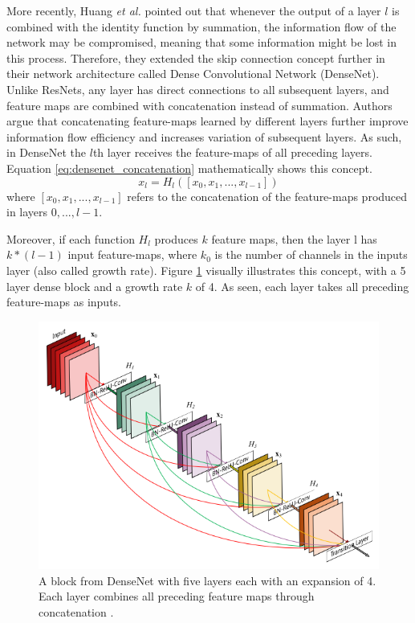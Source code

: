     More recently, Huang \textit{et al.} \cite{densenet} pointed out that whenever the output of a layer $l$ is combined with the identity function by summation, the information flow of the network may be compromised, meaning that some information might be lost in this process. Therefore, they extended the skip connection concept further in their network architecture called Dense Convolutional Network (DenseNet). Unlike ResNets, any layer has direct connections to all subsequent layers, and feature maps are combined with concatenation instead of summation. Authors argue that concatenating feature-maps learned by different layers further improve information flow efficiency and increases variation of subsequent layers. As such, in DenseNet the $l$th layer receives the feature-maps of all preceding layers. Equation \ref{eq:densenet_concatenation} mathematically shows this concept. 
    \begin{equation}
        x_l = H_l([x_0, x_1, . . . , x_{l-1}])
        \label{eq:densenet_concatenation}
    \end{equation}
    where $ [x_0, x_1, . . . , x_{l-1}] $ refers to the concatenation of the feature-maps produced in layers $ 0, . . . , l-1 $. \par
    
    Moreover, if each function $H_l$ produces $k$ feature maps, then the layer l has $k * (l- 1)$ input feature-maps, where $k_0$ is the number of channels in the inputs layer (also called growth rate). Figure \ref{fig:densenet} visually illustrates this concept, with a 5 layer dense block and a growth rate $k$ of 4.  As seen, each layer takes all preceding feature-maps as inputs. \par
    
    \begin{figure}[ht]
      \centering
        \includegraphics[width=0.8\linewidth]{figs/densenet.png}
      \caption[A block from DenseNet with five layers each with an expansion of 4]{A block from DenseNet with five layers each with an expansion of 4. Each layer combines all preceding feature maps through concatenation \cite{densenet}.}
      \label{fig:densenet}
    \end{figure}
    
